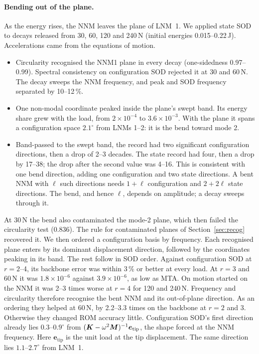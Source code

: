 \documentclass[11pt]{article}
\begin{document}
\paragraph{Bending out of the plane.} As the energy rises, the NNM leaves the plane of LNM~1. We applied state SOD to decays released from 30, 60, 120 and 240\,N (initial energies 0.015--0.22\,J). Accelerations came from the equations of motion.
\begin{itemize}
\item Circularity recognised the NNM1 plane in every decay (one-sidedness 0.97--0.99). Spectral consistency on configuration SOD rejected it at 30 and 60\,N. The decay sweeps the NNM frequency, and peak and SOD frequency separated by 10--12\,\%.
\item One non-modal coordinate peaked inside the plane's swept band. Its energy share grew with the load, from $2\times10^{-4}$ to $3.6\times10^{-3}$. With the plane it spans a configuration space $2.1^\circ$ from LNMs 1--2: it is the bend toward mode 2.
\item Band-passed to the swept band, the record had two significant configuration directions, then a drop of 2--3 decades. The state record had four, then a drop by 17--38; the drop after the second value was 4--16. This is consistent with one bend direction, adding one configuration and two state directions. A bent NNM with $\ell$ such directions needs $1+\ell$ configuration and $2+2\ell$ state directions. The bend, and hence $\ell$, depends on amplitude; a decay sweeps through it.
\end{itemize}
At 30\,N the bend also contaminated the mode-2 plane, which then failed the circularity test (0.836). The rule for contaminated planes of Section~\ref{sec:recog} recovered it.
We then ordered a configuration basis by frequency. Each recognised plane enters by its dominant displacement direction, followed by the coordinates peaking in its band. The rest follow in SOD order. Against configuration SOD at $r=2$--4, its backbone error was within 3\,\% or better at every load. At $r=3$ and 60\,N it was $1.8\times10^{-6}$ against $3.9\times10^{-6}$, as low as MTA. On motion started on the NNM it was 2--3 times worse at $r=4$ for 120 and 240\,N.
Frequency and circularity therefore recognise the bent NNM and its out-of-plane direction. As an ordering they helped at 60\,N, by 2.2--3.3 times on the backbone at $r=2$ and 3. Otherwise they changed ROM accuracy little. Configuration SOD's first direction already lies $0.3$--$0.9^\circ$ from $(\bm{K}-\omega^2\bm{M})^{-1}\bm{e}_{\mathrm{tip}}$, the shape forced at the NNM frequency. Here $\bm{e}_{\mathrm{tip}}$ is the unit load at the tip displacement. The same direction lies $1.1$--$2.7^\circ$ from LNM~1.
\end{document}
